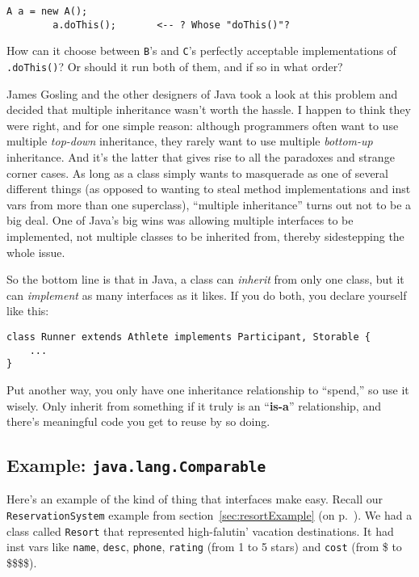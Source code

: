 \begin{Verbatim}[fontsize=\small,samepage=true]
        A a = new A();
        a.doThis();       <-- ? Whose "doThis()"?
\end{Verbatim}

How can it choose between \texttt{B}'s and \texttt{C}'s perfectly acceptable
implementations of \texttt{.doThis()}? Or should it run both of them, and if
so in what order?

James Gosling and the other designers of Java took a look at this problem and
decided that multiple inheritance wasn't worth the hassle. I happen to think
they were right, and for one simple reason: although programmers often want to
use multiple \textit{top-down} inheritance, they rarely want to use multiple
\textit{bottom-up} inheritance. And it's the latter that gives rise to all the
paradoxes and strange corner cases. As long as a class simply wants to
masquerade as one of several different things (as opposed to wanting to steal
method implementations and inst vars from more than one superclass), ``multiple
inheritance'' turns out not to be a big deal. One of Java's big wins was
allowing multiple interfaces to be implemented, not multiple classes to be
inherited from, thereby sidestepping the whole issue.

\begin{samepage}
So the bottom line is that in Java, a class can \textit{inherit} from only one
class, but it can \textit{implement} as many interfaces as it likes. If you do
both, you declare yourself like this:

\begin{Verbatim}[fontsize=\small,samepage=true,frame=single]
class Runner extends Athlete implements Participant, Storable {
    ...
}
\end{Verbatim}
\end{samepage}

Put another way, you only have one inheritance relationship to ``spend,'' so
use it wisely. Only inherit from something if it truly is an ``\textbf{is-a}''
relationship, and there's meaningful code you get to reuse by so doing.

\subsection{Example: \texttt{java.lang.Comparable}}

Here's an example of the kind of thing that interfaces make easy. Recall our
\texttt{ReservationSystem} example from section~\ref{sec:resortExample} (on
p.~\pageref{sec:resortExample}). We had a class called \texttt{Resort} that
represented high-falutin' vacation destinations. It had inst vars like
\texttt{name}, \texttt{desc}, \texttt{phone}, \texttt{rating} (from 1 to 5
stars) and \texttt{cost} (from \$ to \$\$\$\$).


